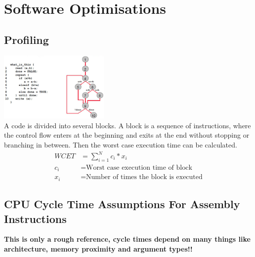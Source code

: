 \section{Software Optimisations }
	\subsection{Profiling}
		\begin{multicols}{2}
			\includegraphics[width=0.4\textwidth]{./pictures/profiling.png} \\
			A code is divided into several blocks. A block is a sequence of instructions, where the control flow enters at the beginning and exits at the end without stopping or branching in between. Then the worst case execution time can be calculated.
			\begin{equation*}
				\begin{aligned}
					WCET &= \sum_{i=1}^{N} c_i * x_i \\
					c_i &= \text{Worst case execution time of block} \\
					x_i &= \text{Number of times the block is executed}
				\end{aligned}
			\end{equation*}			
		\end{multicols}
	
	\subsection{CPU Cycle Time Assumptions For Assembly Instructions}
		{\color{red}\textbf{This is only a rough reference, cycle times depend on many things like architecture, memory proximity and argument types!!}}
		
